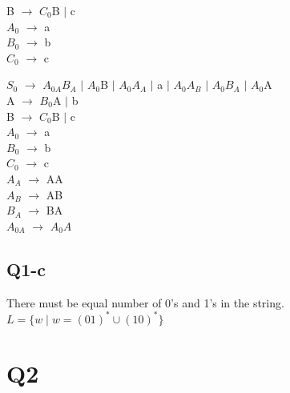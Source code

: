 \documentclass{article}
\begin{document}
\begin{multicols}{2}
\begin{minipage}{0.5\textwidth}
		B $ \rightarrow $ $C_0$B $ \mid $ c \\
		$A_0$ $ \rightarrow $ a \\
		$B_0$ $ \rightarrow $ b \\
		$C_0$ $ \rightarrow $ c \\
	\end{minipage}
	\begin{minipage}{0.5\textwidth}
		$S_0$ $\rightarrow$ $A_{0A}B_A$ $\mid$ $A_0$B $\mid$ $A_0A_A$ $\mid$ a $\mid$ $A_0A_B$ $\mid$ $A_0B_A$ $\mid$ $A_0$A\\
		A $\rightarrow$ $B_0$A $\mid$ b \\
		B $ \rightarrow $ $C_0$B $ \mid $ c \\
		$A_0$ $ \rightarrow $ a \\
		$B_0$ $ \rightarrow $ b \\
		$C_0$ $ \rightarrow $ c \\
		$A_A$ $ \rightarrow $ AA \\
		$A_B$ $ \rightarrow $ AB \\
		$B_A$ $ \rightarrow $ BA \\
		$A_{0A}$ $ \rightarrow $ $A_0A$ \\
	\end{minipage}
\end{multicols}
\newpage
\subsection{Q1-c}
There must be equal number of 0's and 1's in the string. $L = \{ w \mid  w = (01)^* \cup (10)^*\}$
\section{Q2}
	
\end{document}
